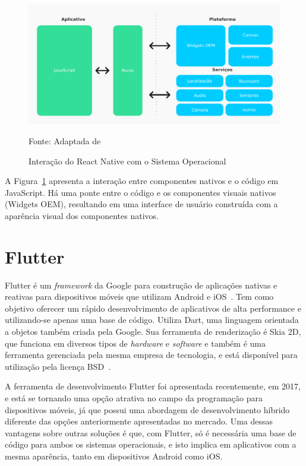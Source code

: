 \begin{figure}[H]
    \centering
    \includegraphics[width=15cm]{imagens/interacaoReactNative}
    \caption{Interação do React Native com o Sistema Operacional}
    Fonte: Adaptada de~\cite{yatsenko2019comparative}
    \label{fig: Interação React Native SO}
\end{figure}

A Figura~\ref{fig: Interação React Native SO} apresenta a interação entre componentes nativos e o código em JavaScript.
Há uma ponte entre o código e os componentes visuais nativos (Widgets OEM), resultando em uma interface de usuário construída com a aparência visual dos componentes nativos.

\section{Flutter}\label{sec:flutter}

Flutter é um \textit{framework} da Google para construção de aplicações nativas e reativas para dispositivos móveis que utilizam Android e iOS~\cite{zammetti2019practical}.
Tem como objetivo oferecer um rápido desenvolvimento de aplicativos de alta performance e utilizando-se apenas uma base de código.
Utiliza Dart, uma linguagem orientada a objetos também criada pela Google.
Sua ferramenta de renderização é Skia 2D, que funciona em diversos tipos de \textit{hardware} e \textit{software} e também é uma ferramenta gerenciada pela mesma empresa de tecnologia, e está disponível para utilização pela licença BSD~\cite{napoli2019beginning}.


A ferramenta de desenvolvimento Flutter foi apresentada recentemente, em 2017, e está se tornando uma opção atrativa no campo da programação para dispositivos móveis, já que possui uma abordagem de desenvolvimento híbrido diferente das opções anteriormente apresentadas no mercado.
Uma dessas vantagens sobre outras soluções é que, com Flutter, só é necessária uma base de código para ambos os sistemas operacionais, e isto implica em aplicativos com a mesma aparência, tanto em dispositivos Android como iOS\@.




